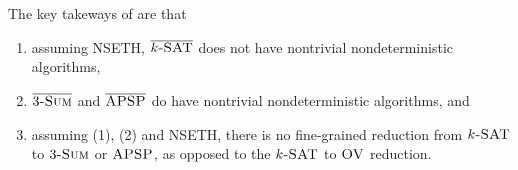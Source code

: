         \vphantom
        \\
        \\
        The key takeways of \cite{carmosino2016nseth} are that
        \begin{enumerate}
            \item assuming NSETH, \(\bar{k\textsc{-SAT}}\) does not have nontrivial nondeterministic algorithms,
            \item \(\bar{3\textsc{-Sum}}\) and \(\bar{\textsc{APSP}}\) do have nontrivial nondeterministic algorithms, and
            \item assuming (1), (2) and NSETH, there is no fine-grained reduction from \(k\textsc{-SAT}\) to \(3\textsc{-Sum}\) or \(\textsc{APSP}\), as opposed to the \(k\textsc{-SAT}\) to \(\textsc{OV}\) reduction.
        \end{enumerate}
        
        \pagebreak


